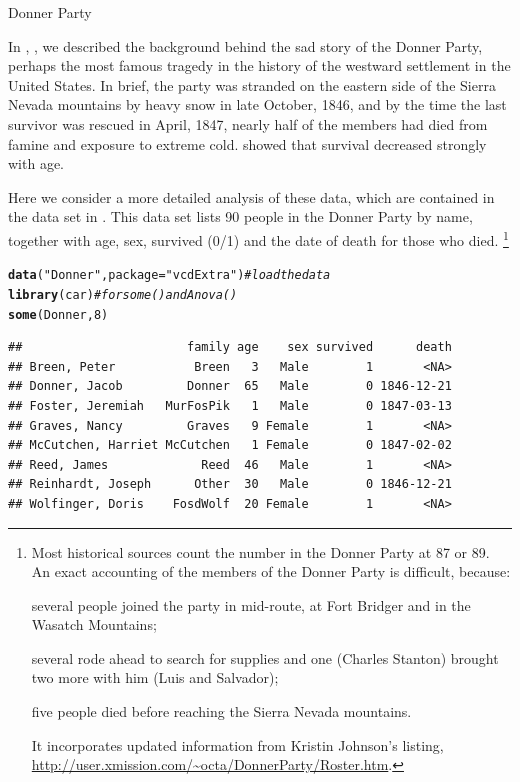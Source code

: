 \documentclass[11pt]{book}\usepackage[]{graphicx}\usepackage[]{color}
\makeatletter
\newcommand{\hlnum}[1]{\textcolor[rgb]{0.686,0.059,0.569}{#1}}%
\newcommand{\hlstr}[1]{\textcolor[rgb]{0.192,0.494,0.8}{#1}}%
\newcommand{\hlcom}[1]{\textcolor[rgb]{0.678,0.584,0.686}{\textit{#1}}}%
\newcommand{\hlstd}[1]{\textcolor[rgb]{0.345,0.345,0.345}{#1}}%
\newcommand{\hlkwc}[1]{\textcolor[rgb]{0.333,0.667,0.333}{#1}}%
\newcommand{\hlkwd}[1]{\textcolor[rgb]{0.737,0.353,0.396}{\textbf{#1}}}%
\newenvironment{kframe}{%
 \def\at@end@of@kframe{}%
 \ifinner\ifhmode%
  \def\at@end@of@kframe{\end{minipage}}%
  \begin{minipage}{\columnwidth}%
 \fi\fi%
 \def\FrameCommand##1{\hskip\@totalleftmargin \hskip-\fboxsep
 \colorbox{shadecolor}{##1}\hskip-\fboxsep
     \hskip-\linewidth \hskip-\@totalleftmargin \hskip\columnwidth}%
 \MakeFramed {\advance\hsize-\width
   \@totalleftmargin\z@ \linewidth\hsize
   \@setminipage}}%
 {\par\unskip\endMakeFramed%
 \at@end@of@kframe}
\newenvironment{knitrout}{}{} %
\renewenvironment{knitrout}{\small\renewcommand{\baselinestretch}{.85}}{} %
\makeatother
\begin{document}
\begin{Example}[donner1]{Donner Party}

In , , we described the background behind the
sad story of the Donner Party, perhaps
the most famous tragedy in the history of the westward settlement in the United States. In brief, the party was stranded on the eastern side of the
Sierra Nevada mountains by heavy snow in late October, 1846, and by
the time the last survivor was rescued in April, 1847, nearly half
of the members had died from famine and exposure to extreme cold.
 showed that survival decreased strongly with age.

Here we consider a more detailed analysis of these data, which are contained in the
data set  in .  This data set lists 90 people in
the Donner Party by name, together with age, sex, survived (0/1) and the date of
death for those who died.%
\footnote{
Most historical sources count the number in the Donner Party at 87 or 89.
An exact accounting of the members of the Donner Party is difficult, because:
\begin{seriate}
 \item several people joined the party in mid-route, at Fort Bridger and in the
Wasatch Mountains; 
 \item several rode ahead to search for supplies and one (Charles Stanton)
 brought two more with him (Luis and Salvador);
 \item five people died before reaching the Sierra Nevada mountains.
\end{seriate}
It incorporates updated information from Kristin Johnson's
listing, \url{http://user.xmission.com/~octa/DonnerParty/Roster.htm}.
}

\begin{knitrout}
\color{fgcolor}\begin{kframe}
\begin{alltt}
\hlkwd{data}\hlstd{(}\hlstr{"Donner"}\hlstd{,} \hlkwc{package}\hlstd{=}\hlstr{"vcdExtra"}\hlstd{)}   \hlcom{# load the data}
\hlkwd{library}\hlstd{(car)}                         \hlcom{# for some() and Anova()}
\hlkwd{some}\hlstd{(Donner,} \hlnum{8}\hlstd{)}
\end{alltt}
\begin{verbatim}
##                       family age    sex survived      death
## Breen, Peter           Breen   3   Male        1       <NA>
## Donner, Jacob         Donner  65   Male        0 1846-12-21
## Foster, Jeremiah   MurFosPik   1   Male        0 1847-03-13
## Graves, Nancy         Graves   9 Female        1       <NA>
## McCutchen, Harriet McCutchen   1 Female        0 1847-02-02
## Reed, James             Reed  46   Male        1       <NA>
## Reinhardt, Joseph      Other  30   Male        0 1846-12-21
## Wolfinger, Doris    FosdWolf  20 Female        1       <NA>
\end{verbatim}
\end{kframe}
\end{knitrout}


\end{Example}
\end{document}
